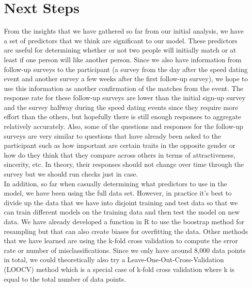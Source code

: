 \documentclass{article}
\begin{document}

\section{Next Steps}
From the insights that we have gathered so far from our initial analysis, we have a set of predictors that we think are significant to our model.  These predictors are useful for determining whether or not two people will initially match or at least if one person will like another person.  Since we also have information from follow-up surveys to the participant (a survey from the day after the speed dating event and another survey a few weeks after the first follow-up survey), we hope to use this information as another confirmation of the matches from the event.  The response rate for these follow-up surveys are lower than the initial sign-up survey and the survey halfway during the speed dating events since they require more effort than the others, but hopefully there is still enough responses to aggregate relatively accurately.  Also, some of the questions and responses for the follow-up surveys are very similar to questions that have already been asked to the participant such as how important are certain traits in the opposite gender or how do they think that they compare across others in terms of attractiveness, sincerity, etc.  In theory, their responses should not change over time through the survey but we should run checks just in case.\\

In addition, so far when casually determining what predictors to use in the model, we have been using the full data set.  However, in practice it's best to divide up the data that we have into disjoint training and test data so that we can train different models on the training data and then test the model on new data.  We have already developed a function in R to use the boostrap method for resampling but that can also create biases for overfitting the data.  Other methods that we have learned are using the k-fold cross validation to compute the error rate or number of misclassifications.  Since we only have around 8,000 data points in total, we could theoretically also try a Leave-One-Out-Cross-Validation (LOOCV) method which is a special case of k-fold cross validation where k is equal to the total number of data points.\\
\end{document}
